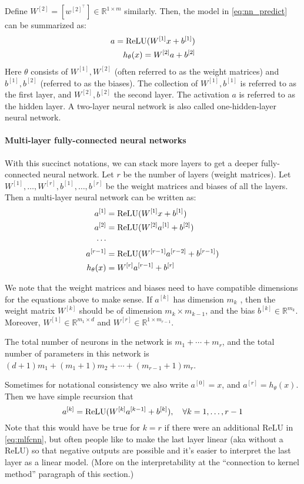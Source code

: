 Define $W^{[2]} = [w^{[2]^\top} ] \in \mathbb{R}^{1 \times m}$ similarly. Then, the model in \cref{eq:nn_predict}
can be summarized as:
\begin{align}
    a = \operatorname{ReLU}(W^{[1]} x + b^{[1]})\\
    h_\theta(x) = W^{[2]} a + b^{[2]}\label{eq:nn_model}
\end{align}
Here $\theta$ consists of $W^{[1]} ,W^{[2]}$ (often referred to as the weight matrices) and
$b^{[1]} ,b^{[2]}$ (referred to as the biases). The collection of $W^{[1]} ,b^{[1]}$ is referred to as
the first layer, and $W^{[2]} ,b^{[2]}$ the second layer. The activation $a$ is referred to as
the hidden layer. A two-layer neural network is also called one-hidden-layer
neural network.


\paragraph{Multi-layer fully-connected neural networks} With this succinct notations,
we can stack more layers to get a deeper fully-connected neural
network. Let $r$ be the number of layers (weight matrices). Let
$W^{[1]} ,\ldots,W^{[r]} ,b^{[1]} ,\ldots,b^{[r]}$ be the weight matrices and biases of all the layers.
Then a multi-layer neural network can be written as:
\begin{align}
    a^{[1]} &= \operatorname{ReLU}(W^{[1]} x + b^{[1]})\\
    a^{[2]} &= \operatorname{ReLU}(W^{[2]} a^{[1]} + b^{[2]} )\\
    \cdots\\
    a^{[r-1]} &= \operatorname{ReLU}(W^{[r-1]} a^{[r-2]} + b^{[r-1]})\\
    h_\theta(x) &= W^{[r]} a^{[r-1]} + b^{[r]}\label{eq:mlfcnn}
\end{align}

We note that the weight matrices and biases need to have compatible
dimensions for the equations above to make sense. If $a^{[k]}$ has dimension $m_k$ ,
then the weight matrix $W^{[k]}$ should be of dimension $m_k \times m_{k-1}$, and the bias
$b^{[k]} \in \mathbb{R}^{m_k}$. Moreover, $W^{[1]} \in \mathbb{R}^{m_1 \times d}$ and $W^{[r]} \in \mathbb{R}^{1 \times m_{r-1}}$.

The total number of neurons in the network is $m_1 + \cdots + m_r$, and the
total number of parameters in this network is $(d+1)m_1 +(m_1 + 1)m_2 + \cdots + (m_{r-1} + 1)m_r$.

Sometimes for notational consistency we also write $a^{[0]} = x$, and $a^{[r]} = h_\theta(x)$. Then we have simple recursion that
\begin{equation}
    a^{[k]} = \operatorname{ReLU}(W^{[k]} a^{[k-1]} + b^{[k]}),\quad \forall k = 1,\ldots,r-1
\end{equation}
Note that this would have be true for $k = r$ if there were an additional
ReLU in \cref{eq:mlfcnn}, but often people like to make the last layer linear
(aka without a ReLU) so that negative outputs are possible and it's easier
to interpret the last layer as a linear model. (More on the interpretability at
the ``connection to kernel method'' paragraph of this section.)

